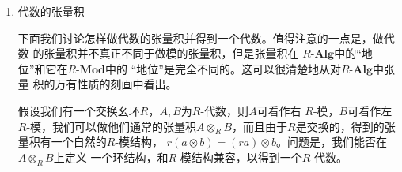 \documentclass{ctexart}
\newtheorem*{thm}{定理}
\DeclareMathOperator{\Ima}{Im}
\begin{document}
\begin{enumerate}
我们说一个$R$-模$F$是自由的，如果存在一个$S$上的自由模$(M,i)$使得$F \cong M$。

\begin{thm}
令$(F,i)$为一个$S$上的自由左$R$-模，则 $i$ 是单射且$\Ima i$生成 $F$。
\end{thm}

\begin{thm}
令$(F,i)$和$(K,j)$是$S$上的两个自由模，则$F \cong K$。
\end{thm}

\begin{thm}
任意集合上的自由模一定存在。
\end{thm}

我们现在定义一个模的基的概念，并证明一个模存在基等价于这个模是自由的。
我们把左$R$-模$M$的一个有限集合$\{m_1,\cdots ,m_n\}$叫做线性无关，如果由
$\sum_ir_im_i = 0$可推出$r_1 = \cdots = r_n = 0$。我们把一个子集
$\{m_\alpha\}_{\alpha \in \mathcal{A}}$叫做线性无关，如果此集合的任意有
限子集都线性无关。$M$的一个基就是$M$的一个子集$\mathscr{B}$，这个子集即生成$M$又线
性无关。

\begin{thm}
$M$为左$R$-模，则$\mathscr{B}$为$M$的一个基当且仅当$M$中的每一个元素都
可以唯一写成$\mathscr{B}$中元素的$R$线性组合。
\end{thm}

\begin{thm}
若$(F, i)$是$S$上的一个自由模，则$\Ima i$是$F$的一个基。
\end{thm}

\begin{thm}
令$R$是一个幺环，$F$是一个左$R$-模，则$F$是自由的当且仅当$F$
有一个基。
\end{thm}

\item 代数的张量积

下面我们讨论怎样做代数的张量积并得到一个代数。值得注意的一点是，做代数
的张量积并不真正不同于做模的张量积，但是张量积在
$R\text{-}\mathbf{Alg}$中的“地位”和它在$R\text{-}\mathbf{Mod}$中的
“地位”是完全不同的。这可以很清楚地从对$R\text{-}\mathbf{Alg}$中张量
积的万有性质的刻画中看出。

假设我们有一个交换幺环$R$，$A,B$为$R\text{-}$代数，则$A$可看作右
$R\text{-}$模，$B$可看作左$R\text{-}$模，我们可以做他们通常的张量积$A
\otimes_R B$，而且由于$R$是交换的，得到的张量积有一个自然的$R\text{-}$模结构，
$r(a\otimes b) = (ra)\otimes b$。问题是，我们能否在$A \otimes_R B$上定义
一个环结构，和$R\text{-}$模结构兼容，以得到一个$R\text{-}$代数。


\end{enumerate}
\end{document}

